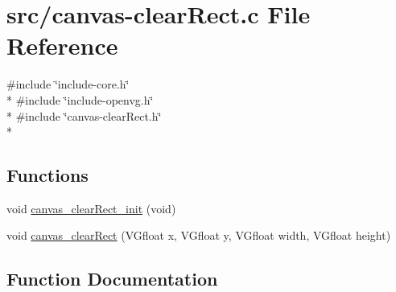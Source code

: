 \hypertarget{canvas-clearRect_8c}{}\section{src/canvas-\/clear\+Rect.c File Reference}
\label{canvas-clearRect_8c}
{\ttfamily \#include \char`\"{}include-\/core.\+h\char`\"{}}\\*
{\ttfamily \#include \char`\"{}include-\/openvg.\+h\char`\"{}}\\*
{\ttfamily \#include \char`\"{}canvas-\/clear\+Rect.\+h\char`\"{}}\\*
\subsection*{Functions}
\begin{DoxyCompactItemize}
\item 
void \hyperlink{canvas-clearRect_8c_a035739841862c79770e921d78d132364}{canvas\+\_\+clear\+Rect\+\_\+init} (void)
\item 
void \hyperlink{canvas-clearRect_8c_a73f7ee53af695ef904c3033f8f7601af}{canvas\+\_\+clear\+Rect} (V\+Gfloat x, V\+Gfloat y, V\+Gfloat width, V\+Gfloat height)
\end{DoxyCompactItemize}


\subsection{Function Documentation}
\hypertarget{canvas-clearRect_8c_a73f7ee53af695ef904c3033f8f7601af}{}
